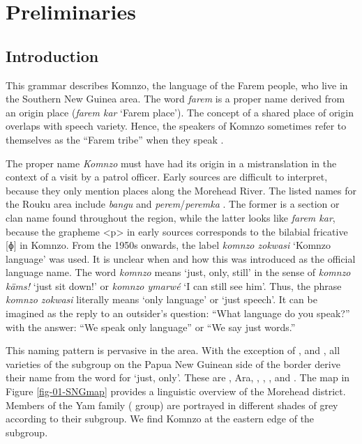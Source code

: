 
\chapter{Preliminaries}
\label{cha:The language and its speakers}

\section{Introduction}\label{prelimintro}
This grammar describes Komnzo, the language of the Farem people, who live in the Southern New Guinea area. The word \emph{farem} is a proper name derived from an origin place (\textit{farem kar} `Farem place'). The concept of a shared place of origin overlaps with speech variety. Hence, the speakers of Komnzo sometimes refer to themselves as the ``Farem tribe'' when they speak .

The proper name \emph{Komnzo} must have had its origin in a mistranslation in the context of a visit by a patrol officer. Early sources are difficult to interpret, because they only mention places along the Morehead River. The listed names for the Rouku area include \emph{bangu} \citep[292]{Ray:1907westfly} and \emph{perem}/\emph{peremka} \citep[334]{Ray:1923westerndiv}. The former is a section or clan name found throughout the region, while the latter looks like \emph{farem kar}, because the grapheme <p> in early sources corresponds to the bilabial fricative [ɸ] in Komnzo. From the 1950s onwards, the label \emph{komnzo zokwasi} `Komnzo language' was used. It is unclear when and how this was introduced as the official language name. The word \emph{komnzo} means `just, only, still' in the sense of \emph{komnzo käms!} `just sit down!' or \emph{komnzo ymarwé} `I can still see him'. Thus, the phrase \emph{komnzo zokwasi} literally means `only language' or `just speech'. It can be imagined as the reply to an outsider's question: ``What language do you speak?'' with the answer: ``We speak only language'' or ``We say just words.''

This naming pattern is pervasive in the area. With the exception of ,  and , all varieties of the  subgroup on the Papua New Guinean side of the border derive their name from the word for `just, only'. These are , Ara, , , ,  and . The map in Figure \ref{fig-01-SNGmap} provides a linguistic overview of the Morehead district. Members of the Yam family ( group) are portrayed in different shades of grey according to their subgroup. We find Komnzo at the eastern edge of the  subgroup.

